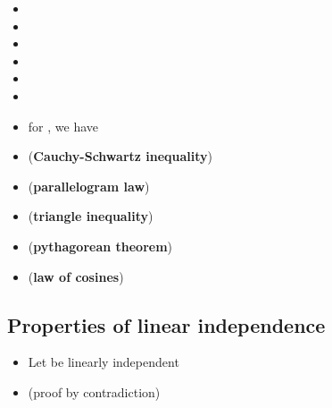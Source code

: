 \begin{itemize}

  \item
  \item
  \item
  \item
  \item
  \item
  \item
        for , we have
  \item
        (\textbf{Cauchy-Schwartz inequality})
  \item
        (\textbf{parallelogram law})
  \item
        (\textbf{triangle inequality})
  \item
        (\textbf{pythagorean theorem})
  \item
        (\textbf{law of cosines})
\end{itemize}

\subsection*{Properties of linear
  independence}

\begin{itemize}

  \item
        Let  be
        linearly independent
  \item
         (proof by contradiction)
\end{itemize}

